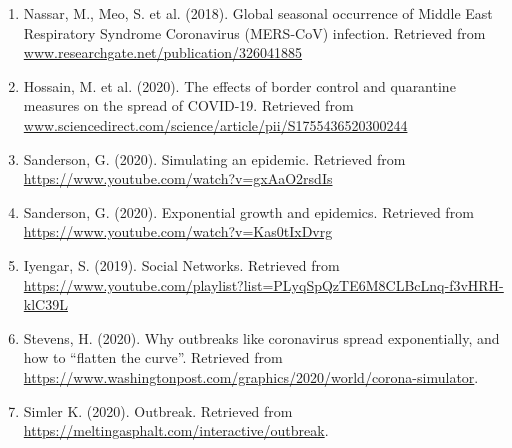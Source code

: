 \documentclass[conference]{IEEEtran}
\begin{document}
\begin{enumerate}
        \item Nassar, M., Meo, S. et al. (2018). Global seasonal occurrence of Middle East Respiratory Syndrome Coronavirus (MERS-CoV) infection. Retrieved from \url{www.researchgate.net/publication/326041885}
        
        \item Hossain, M. et al. (2020). The effects of border control and quarantine measures on the spread of COVID-19. Retrieved from \url{www.sciencedirect.com/science/article/pii/S1755436520300244}
    
        \item Sanderson, G. (2020). Simulating an epidemic. Retrieved from \url{https://www.youtube.com/watch?v=gxAaO2rsdIs}
        
        \item Sanderson, G. (2020). Exponential growth and epidemics. Retrieved from \url{https://www.youtube.com/watch?v=Kas0tIxDvrg}
        
        \item Iyengar, S. (2019). Social Networks. Retrieved from \url{https://www.youtube.com/playlist?list=PLyqSpQzTE6M8CLBcLnq-f3vHRH-klC39L}
        
        \item Stevens, H. (2020). Why outbreaks like coronavirus spread exponentially, and how to “flatten the curve”. Retrieved from \url{https://www.washingtonpost.com/graphics/2020/world/corona-simulator}.
        
        \item Simler K. (2020). Outbreak. Retrieved from \url{https://meltingasphalt.com/interactive/outbreak}.
    \end{enumerate}
\end{document}
